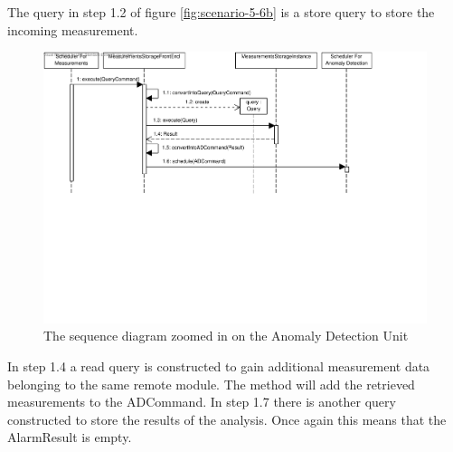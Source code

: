 \npar The query in step 1.2 of figure \ref{fig:scenario-5-6b} is a store query
to store the incoming measurement.

\begin{figure}[H]
	\begin{centering}
		\includegraphics[width=\textwidth]{figs/scenario-5-6b.pdf}
		\caption{The sequence diagram zoomed in on the Anomaly Detection Unit}
		\label{fig:scenario-5-6c}
	\end{centering}
\end{figure}

\npar In step 1.4 a read query is constructed to gain additional measurement
data belonging to the same remote module. The  method
will add the retrieved measurements to the ADCommand. In step 1.7 there is
another query constructed to store the results of the analysis. Once again this
means that the AlarmResult is empty.




